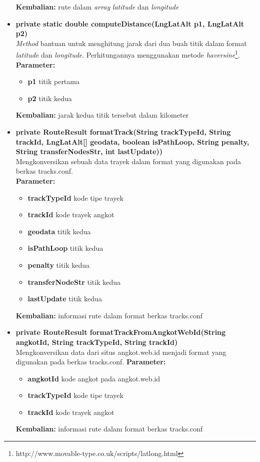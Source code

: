 \begin{itemize}
		\textbf{Kembalian:} rute dalam \textit{array} \textit{latitude} dan \textit{longitude}
	\item \textbf{private static double computeDistance(LngLatAlt p1, LngLatAlt p2)} \\
		\textit{Method} bantuan untuk menghitung jarak dari dua buah titik dalam format \textit{latitude} dan \textit{longitude}. Perhitungannya menggunakan metode \textit{haversine}\footnote{http://www.movable-type.co.uk/scripts/latlong.html}.
		\textbf{Parameter:}
		\begin{itemize}
			\item \textbf{p1} titik pertama
			\item \textbf{p2} titik kedua
		\end{itemize}
		\textbf{Kembalian:} jarak kedua titik tersebut dalam kilometer
	\item \textbf{private RouteResult formatTrack(String trackTypeId, String trackId,
			LngLatAlt[] geodata, boolean isPathLoop, String penalty,
			String transferNodesStr, int lastUpdate))} \\
		Mengkonversikan sebuah data trayek dalam format yang digunakan pada berkas tracks.conf. \\
		\textbf{Parameter:}
		\begin{itemize}
			\item \textbf{trackTypeId} kode tipe trayek
			\item \textbf{trackId} kode trayek angkot
			\item \textbf{geodata} titik kedua
			\item \textbf{isPathLoop} titik kedua
			\item \textbf{penalty} titik kedua
			\item \textbf{transferNodeStr} titik kedua
			\item \textbf{lastUpdate} titik kedua
		\end{itemize}
		\textbf{Kembalian:} informasi rute dalam format berkas tracks.conf
	\item \textbf{private RouteResult formatTrackFromAngkotWebId(String angkotId, String trackTypeId, String trackId)} \\
		Mengkonversikan data dari situs angkot.web.id menjadi format yang digunakan pada berkas tracks.conf.
		\textbf{Parameter:}
		\begin{itemize}
			\item \textbf{angkotId} kode angkot pada angkot.web.id
			\item \textbf{trackTypeId} kode tipe trayek
			\item \textbf{trackId} kode trayek angkot
		\end{itemize}
		\textbf{Kembalian:} informasi rute dalam format berkas tracks.conf
\end{itemize}

